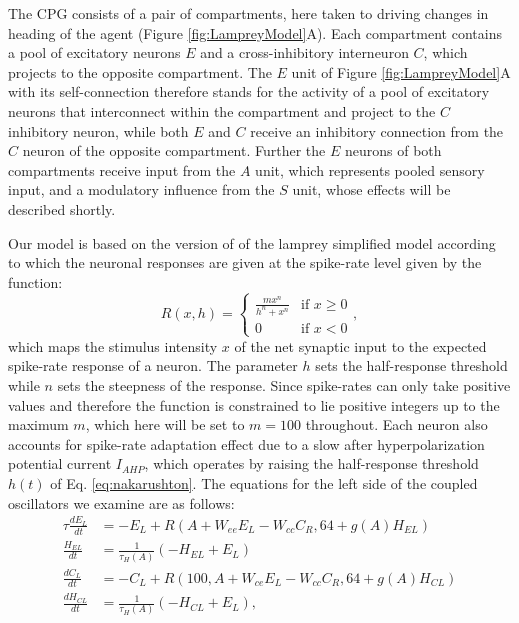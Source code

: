 \documentclass[11pt,a4paper]{article}
\begin{document}
The CPG consists of a pair of compartments, here taken to driving changes in heading of the agent (Figure \ref{fig:LampreyModel}A). 
Each compartment contains a pool of excitatory neurons $E$ and a cross-inhibitory interneuron $C$, which projects to the opposite compartment.
 The $E$ unit of Figure \ref{fig:LampreyModel}A with its self-connection therefore stands for the activity of a pool of excitatory neurons that interconnect within the compartment and project to the $C$ inhibitory neuron, while both  $E$ and $C$ receive an inhibitory connection from the $C$ neuron of the opposite compartment.
  Further the $E$ neurons of both compartments receive input from the $A$ unit, which represents pooled sensory input, and a modulatory influence from the $S$ unit, whose effects will be described shortly.


Our model is based on the version of \cite{wilson1999spikes} of the lamprey simplified model \citep{lansner1997realistic}  according to which the neuronal responses are given at the spike-rate level given by the \cite{naka1966s} function:
\begin{equation}
\label{eq:nakarushton}
R(x,h) = \begin{cases} 
\frac{m x^n}{h^n + x^n} &\mbox{if } x \geq 0 \\
0 						&\mbox{if } x < 0
\end{cases},
\end{equation}
which maps the stimulus intensity $x$ of the net synaptic input to the expected spike-rate response of a neuron. The parameter $h$ sets the half-response threshold while $n$ sets the steepness of the response.
 Since spike-rates can only take positive values and therefore the function is constrained to lie positive integers up to the maximum $m$, which here will be set to $m=100$ throughout.%
Each neuron also accounts for spike-rate adaptation effect due to a slow after hyperpolarization potential current $I_{AHP}$, which operates by raising the half-response threshold $h(t)$ of Eq. \eqref{eq:nakarushton}.
 The equations for the left side of the coupled oscillators we examine are as follows:
\begin{align}
\tau \frac{dE_L}{dt} & = - E_L +  R( A + W_{ee} E_L - W_{cc}C_R, 64 + g(A)H_{EL})\\
\frac{H_{EL}}{dt} &= \frac{1}{\tau_H(A)}(-H_{EL}+E_L)\\
\frac{dC_L}{dt} &= -C_L + R(100, A + W_{ce}E_L - W_{cc}C_R, 64+g(A)H_{CL})\\
\frac{dH_{CL}}{dt} &= \frac{1}{\tau_H(A)}(-H_{CL}+E_L),
\end{align}
\end{document}
